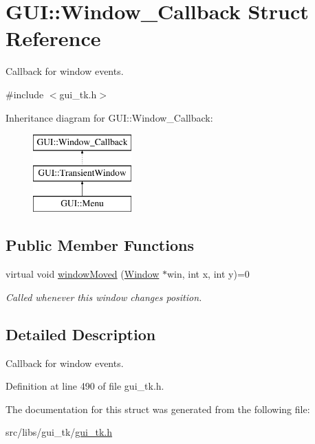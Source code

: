 \hypertarget{structGUI_1_1Window__Callback}{\section{G\-U\-I\-:\-:Window\-\_\-\-Callback Struct Reference}
\label{structGUI_1_1Window__Callback}
}


Callback for window events.  




{\ttfamily \#include $<$gui\-\_\-tk.\-h$>$}

Inheritance diagram for G\-U\-I\-:\-:Window\-\_\-\-Callback\-:\begin{figure}[H]
\begin{center}
\leavevmode
\includegraphics[height=3.000000cm]{structGUI_1_1Window__Callback}
\end{center}
\end{figure}
\subsection*{Public Member Functions}
\begin{DoxyCompactItemize}
\item 
\hypertarget{structGUI_1_1Window__Callback_a65e7bae539620c03486613128701b96f}{virtual void \hyperlink{structGUI_1_1Window__Callback_a65e7bae539620c03486613128701b96f}{window\-Moved} (\hyperlink{classGUI_1_1Window}{Window} $\ast$win, int x, int y)=0}\label{structGUI_1_1Window__Callback_a65e7bae539620c03486613128701b96f}

\begin{DoxyCompactList}\small\item\em Called whenever this window changes position. \end{DoxyCompactList}\end{DoxyCompactItemize}


\subsection{Detailed Description}
Callback for window events. 

Definition at line 490 of file gui\-\_\-tk.\-h.



The documentation for this struct was generated from the following file\-:\begin{DoxyCompactItemize}
\item 
src/libs/gui\-\_\-tk/\hyperlink{gui__tk_8h}{gui\-\_\-tk.\-h}\end{DoxyCompactItemize}
